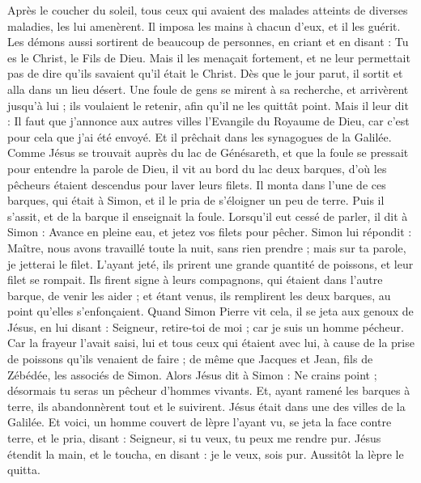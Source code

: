\begin{multicols}{2}
Après le coucher du soleil, tous ceux qui avaient des malades atteints de diverses maladies, les lui amenèrent. Il imposa les mains à chacun d'eux, et il les guérit.
Les démons aussi sortirent de beaucoup de personnes, en criant et en disant : Tu es le Christ, le Fils de Dieu. Mais il les menaçait fortement, et ne leur permettait pas de dire qu'ils savaient qu'il était le Christ.
Dès que le jour parut, il sortit et alla dans un lieu désert. Une foule de gens se mirent à sa recherche, et arrivèrent jusqu’à lui ; ils voulaient le retenir, afin qu’il ne les quittât point.
Mais il leur dit : Il faut que j’annonce aux autres villes l’Evangile du Royaume de Dieu, car c’est pour cela que j’ai été envoyé.
Et il prêchait dans les synagogues de la Galilée.
\VerseOne{}Comme Jésus se trouvait auprès du lac de Génésareth, et que la foule se pressait pour entendre la parole de Dieu,
il vit au bord du lac deux barques, d’où les pêcheurs étaient descendus pour laver leurs filets.
Il monta dans l'une de ces barques, qui était à Simon, et il le pria de s’éloigner un peu de terre. Puis il s’assit, et de la barque il enseignait la foule.
Lorsqu’il eut cessé de parler, il dit à Simon : Avance en pleine eau, et jetez vos filets pour pêcher.
Simon lui répondit : Maître, nous avons travaillé toute la nuit, sans rien prendre ; mais sur ta parole, je jetterai le filet.
L’ayant jeté, ils prirent une grande quantité de poissons, et leur filet se rompait.
Ils firent signe à leurs compagnons, qui étaient dans l'autre barque, de venir les aider ; et étant venus, ils remplirent les deux barques, au point qu'elles s'enfonçaient.
Quand Simon Pierre vit cela, il se jeta aux genoux de Jésus, en lui disant : Seigneur, retire-toi de moi ; car je suis un homme pécheur.
Car la frayeur l'avait saisi, lui et tous ceux qui étaient avec lui, à cause de la prise de poissons qu'ils venaient de faire ; de même que Jacques et Jean, fils de Zébédée, les associés de Simon.
Alors Jésus dit à Simon : Ne crains point ; désormais tu seras un pêcheur d'hommes vivants.
Et, ayant ramené les barques à terre, ils abandonnèrent tout et le suivirent.
Jésus était dans une des villes de la Galilée. Et voici, un homme couvert de lèpre l’ayant vu, se jeta la face contre terre, et le pria, disant : Seigneur, si tu veux, tu peux me rendre pur.
Jésus étendit la main, et le toucha, en disant : je le veux, sois pur. Aussitôt la lèpre le quitta.

\end{multicols}
